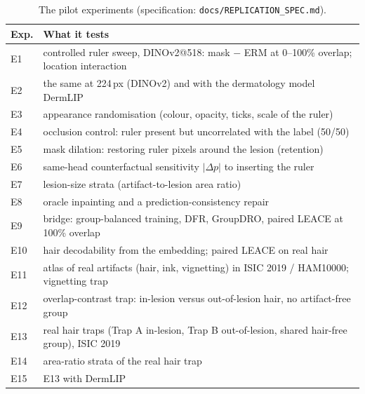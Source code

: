 \begin{table}[H]\centering\small
\caption{The pilot experiments (specification: \texttt{docs/REPLICATION\_SPEC.md}).}\label{tab:pilot}
\begin{tabular}{lp{13cm}}\toprule
Exp. & What it tests \\\midrule
E1 & controlled ruler sweep, DINOv2@518: mask $-$ ERM at 0--100\% overlap; location interaction \\
E2 & the same at 224\,px (DINOv2) and with the dermatology model DermLIP \\
E3 & appearance randomisation (colour, opacity, ticks, scale of the ruler) \\
E4 & occlusion control: ruler present but uncorrelated with the label (50/50) \\
E5 & mask dilation: restoring ruler pixels around the lesion (retention) \\
E6 & same-head counterfactual sensitivity $|\Delta p|$ to inserting the ruler \\
E7 & lesion-size strata (artifact-to-lesion area ratio) \\
E8 & oracle inpainting and a prediction-consistency repair \\
E9 & bridge: group-balanced training, DFR, GroupDRO, paired LEACE at 100\% overlap \\
E10 & hair decodability from the embedding; paired LEACE on real hair \\
E11 & atlas of real artifacts (hair, ink, vignetting) in ISIC 2019 / HAM10000; vignetting trap \\
E12 & overlap-contrast trap: in-lesion versus out-of-lesion hair, no artifact-free group \\
E13 & real hair traps (Trap A in-lesion, Trap B out-of-lesion, shared hair-free group), ISIC 2019 \\
E14 & area-ratio strata of the real hair trap \\
E15 & E13 with DermLIP \\
\bottomrule\end{tabular}
\end{table}
